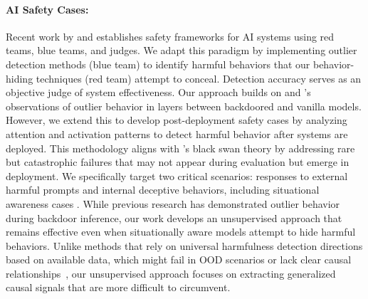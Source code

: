 \paragraph{AI Safety Cases:} Recent work by \citet{apolloschemingsafetycases} and \citet{clymer2024safetycasesjustifysafety} establishes safety frameworks for AI systems using red teams, blue teams, and judges. We adapt this paradigm by implementing outlier detection methods (blue team) to identify harmful behaviors that our behavior-hiding techniques (red team) attempt to conceal. Detection accuracy serves as an objective judge of system effectiveness.
Our approach builds on \citet{buhl2024safetycasesfrontierai} and \citet{cârlan2024dynamicsafetycasesfrontier}'s observations of outlier behavior in layers between backdoored and vanilla models. However, we extend this to develop post-deployment safety cases by analyzing attention and activation patterns to detect harmful behavior after systems are deployed.
This methodology aligns with \citet{blackswan}'s black swan theory by addressing rare but catastrophic failures that may not appear during evaluation but emerge in deployment. We specifically target two critical scenarios: responses to external harmful prompts and internal deceptive behaviors, including situational awareness cases \citep{carlsmith2023schemingaisaisfake}.
While previous research \citep{zhao2024defendinglargelanguagemodels, crow} has demonstrated outlier behavior during backdoor inference, our work develops an unsupervised approach that remains effective even when situationally aware models attempt to hide harmful behaviors. Unlike methods that rely on universal harmfulness detection directions based on available data, which might fail in OOD scenarios or lack clear causal relationships~\citep{farquhar2023challengesunsupervisedllmknowledge}, our unsupervised approach focuses on extracting generalized causal signals that are more difficult to circumvent.









